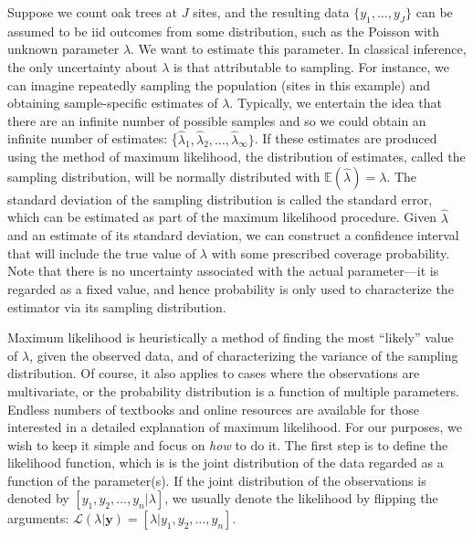 Suppose  we count oak trees at
$J$ sites, and the resulting data $\{y_1, \ldots, y_J\}$ can be
assumed to be iid outcomes from some %
distribution, such as the Poisson with unknown parameter $\lambda$. We
want to estimate this parameter. %
In classical inference, the only uncertainty about $\lambda$ %
is that attributable to
sampling. For instance, we can imagine repeatedly sampling the
population (sites in this example) and obtaining sample-specific estimates of
$\lambda$. Typically, we entertain the idea that there are an infinite
number of possible samples and so we could obtain an infinite
number of estimates: \{$\hat{\lambda}_1, \hat{\lambda}_2, \hdots,
\hat{\lambda}_\infty\}$. If
these estimates are produced using the method of maximum likelihood,
the distribution of estimates, called the sampling distribution, will
be normally distributed with $\mathbb{E}(\hat{\lambda})=\lambda$. The
standard deviation of the sampling distribution is called the standard
error, which can  be estimated as part of the maximum likelihood
procedure. Given $\hat{\lambda}$ and an estimate of its standard
deviation, we can construct a confidence interval
that will include the true value of $\lambda$  with some prescribed
coverage probability.
Note that there is
no uncertainty associated with the actual parameter---it is regarded
as a fixed value, and hence probability is only used to characterize
the estimator via its sampling distribution.

Maximum likelihood is heuristically a method of finding the most ``likely''
value of $\lambda$, given the observed data, and of characterizing the
variance of the sampling distribution. Of course, it also applies to
cases where the observations are multivariate, or the probability
distribution is a function of multiple parameters. Endless numbers of
textbooks and online resources are available for those interested in a
detailed explanation of maximum likelihood. For our purposes, we wish
to keep it simple and focus on \textit{how} to do it. The first step
is to define the likelihood function, which is
is the joint distribution of the data regarded as a function of
the parameter(s). If the joint distribution of the observations is
denoted by $[y_1, y_2, \dots, y_n | \lambda]$, we usually denote the
likelihood by flipping the arguments:
$\mathcal{L}(\lambda | \mathbf{y}) = [\lambda | y_1, y_2, \dots, y_n]$.

